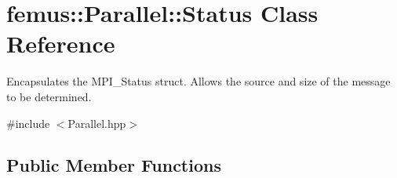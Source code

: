 \hypertarget{classfemus_1_1_parallel_1_1_status}{}\section{femus\+:\+:Parallel\+:\+:Status Class Reference}
\label{classfemus_1_1_parallel_1_1_status}


Encapsulates the M\+P\+I\+\_\+\+Status struct. Allows the source and size of the message to be determined.  




{\ttfamily \#include $<$Parallel.\+hpp$>$}

\subsection*{Public Member Functions}
